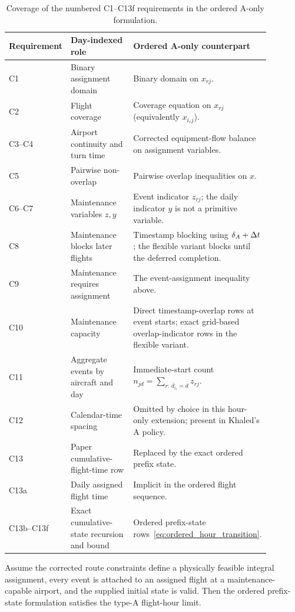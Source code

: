 \begin{table}[t]
\centering\scriptsize
\caption{Coverage of the numbered C1--C13f requirements in the ordered A-only
	formulation.}
\label{tab:ordered_c1_c13}
\begin{tabular}{p{0.10\linewidth} p{0.30\linewidth} p{0.48\linewidth}}
\toprule
Requirement & Day-indexed role & Ordered A-only counterpart \\
\midrule
C1 & Binary assignment domain & Binary domain on $x_{rj}$. \\
C2 & Flight coverage & Coverage equation on $x_{rj}$ (equivalently $x_{i_rj}$). \\
C3--C4 & Airport continuity and turn time & Corrected equipment-flow balance on assignment variables. \\
C5 & Pairwise non-overlap & Pairwise overlap inequalities on $x$. \\
C6--C7 & Maintenance variables $z,y$ & Event indicator $z_{rj}$; the daily indicator $y$ is not a primitive variable. \\
C8 & Maintenance blocks later flights & Timestamp blocking using $\delta_A+\Delta t$; the flexible variant blocks until the deferred completion. \\
C9 & Maintenance requires assignment & The event-assignment inequality above. \\
C10 & Maintenance capacity & Direct timestamp-overlap rows at event starts; exact grid-based overlap-indicator rows in the flexible variant. \\
C11 & Aggregate events by aircraft and day & Immediate-start count $n_{jd}=\sum_{r:\,\bar d_{i_r}=d}z_{rj}$. \\
C12 & Calendar-time spacing & Omitted by choice in this hour-only extension; present in Khaled's A policy. \\
C13 & Paper cumulative-flight-time row & Replaced by the exact ordered prefix state. \\
C13a & Daily assigned flight time & Implicit in the ordered flight sequence. \\
C13b--C13f & Exact cumulative-state recursion and bound & Ordered prefix-state rows~\eqref{eq:ordered_hour_transition}. \\
\bottomrule
\end{tabular}
\end{table}

\begin{proposition}
\label{prop:ordered_event_correct}
Assume the corrected route constraints define a physically feasible integral
assignment, every event is attached to an assigned flight at a
maintenance-capable airport, and the supplied initial state is valid. Then the
ordered prefix-state formulation satisfies the type-A flight-hour limit.
\end{proposition}

